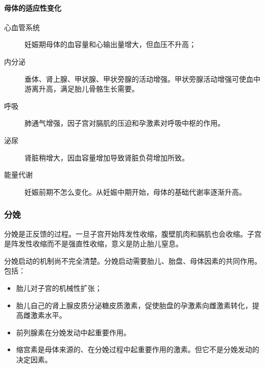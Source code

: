\paragraph{母体的适应性变化}

\begin{description}
	\item[心血管系统] 妊娠期母体的血容量和心输出量增大，但血压不升高；
	\item[内分泌] 垂体、肾上腺、甲状腺、甲状旁腺的活动增强。甲状旁腺活动增强可使血中游离升高，满足胎儿骨骼生长需要。
	\item[呼吸] 肺通气增强，因子宫对膈肌的压迫和孕激素对呼吸中枢的作用。
	\item[泌尿] 肾脏稍增大，因血容量增加导致肾脏负荷增加所致。
	\item[能量代谢] 妊娠前期不怎么变化。从妊娠中期开始，母体的基础代谢率逐渐升高。
\end{description}

\subsubsection{分娩}

分娩是正反馈的过程。一旦子宫开始阵发性收缩，腹壁肌肉和膈肌也会收缩。子宫是阵发性收缩而不是强直性收缩，意义是防止胎儿窒息。

分娩启动的机制尚不完全清楚。分娩启动需要胎儿、胎盘、母体因素的共同作用。包括：
\begin{itemize}
	\item 胎儿对子宫的机械性扩张；
	\item 胎儿自己的肾上腺皮质分泌糖皮质激素，促使胎盘的孕激素向雌激素转化，提高雌激素水平。
	\item 前列腺素在分娩发动中起重要作用。
	\item 缩宫素是母体来源的、在分娩过程中起重要作用的激素。但它不是分娩发动的决定因素。
\end{itemize}